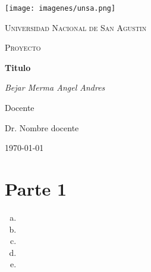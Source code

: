 \documentclass[12pt]{article}
\begin{document}
%

%

\begin{titlepage}

	\centering
	\texttt{[image: imagenes/unsa.png]}\par\vspace{1cm}
	{\scshape\LARGE Universidad Nacional de San Agustin \par}
	\vspace{1cm}
	{\scshape\Large Proyecto \par}
	\vspace{1.5cm}
	{\huge\bfseries Titulo\par}
	\vspace{2cm}
	{\Large\itshape Bejar Merma Angel Andres\par}
	\vfill
	Docente \par
	Dr. Nombre docente \textsc{}

	\vfill

	{\large \today\par}
\end{titlepage}













\section{Parte 1}

\begin{enumerate}[(a)]

\item 
\item 

\item 
\item 

\item 
\end{enumerate}
\end{document}
